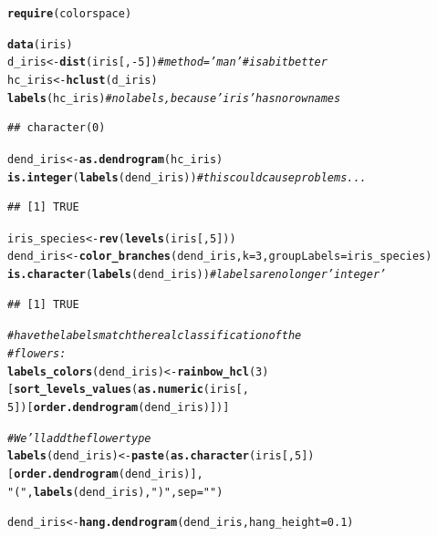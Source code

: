 \documentclass[shortnames,nojss,article]{jss}\usepackage[]{graphicx}\usepackage[]{color}
\makeatletter
\newcommand{\hlnum}[1]{\textcolor[rgb]{0.686,0.059,0.569}{#1}}%
\newcommand{\hlstr}[1]{\textcolor[rgb]{0.192,0.494,0.8}{#1}}%
\newcommand{\hlcom}[1]{\textcolor[rgb]{0.678,0.584,0.686}{\textit{#1}}}%
\newcommand{\hlopt}[1]{\textcolor[rgb]{0,0,0}{#1}}%
\newcommand{\hlstd}[1]{\textcolor[rgb]{0.345,0.345,0.345}{#1}}%
\newcommand{\hlkwb}[1]{\textcolor[rgb]{0.69,0.353,0.396}{#1}}%
\newcommand{\hlkwc}[1]{\textcolor[rgb]{0.333,0.667,0.333}{#1}}%
\newcommand{\hlkwd}[1]{\textcolor[rgb]{0.737,0.353,0.396}{\textbf{#1}}}%
\newenvironment{kframe}{%
 \def\at@end@of@kframe{}%
 \ifinner\ifhmode%
  \def\at@end@of@kframe{\end{minipage}}%
  \begin{minipage}{\columnwidth}%
 \fi\fi%
 \def\FrameCommand##1{\hskip\@totalleftmargin \hskip-\fboxsep
 \colorbox{shadecolor}{##1}\hskip-\fboxsep
     \hskip-\linewidth \hskip-\@totalleftmargin \hskip\columnwidth}%
 \MakeFramed {\advance\hsize-\width
   \@totalleftmargin\z@ \linewidth\hsize
   \@setminipage}}%
 {\par\unskip\endMakeFramed%
 \at@end@of@kframe}
\newenvironment{knitrout}{}{} %
\makeatother
\begin{document}
\begin{knitrout}
\color{fgcolor}\begin{kframe}
\begin{alltt}
\hlkwd{require}\hlstd{(colorspace}\hlstd{)}

\hlkwd{data}\hlstd{(iris)}
\hlstd{d_iris} \hlkwb{<-} \hlkwd{dist}\hlstd{(iris[,} \hlopt{-}\hlnum{5}\hlstd{])}  \hlcom{# method='man' # is a bit better}
\hlstd{hc_iris} \hlkwb{<-} \hlkwd{hclust}\hlstd{(d_iris)}
\hlkwd{labels}\hlstd{(hc_iris)}  \hlcom{# no labels, because 'iris' has no row names}
\end{alltt}
\begin{verbatim}
## character(0)
\end{verbatim}
\begin{alltt}
\hlstd{dend_iris} \hlkwb{<-} \hlkwd{as.dendrogram}\hlstd{(hc_iris)}
\hlkwd{is.integer}\hlstd{(}\hlkwd{labels}\hlstd{(dend_iris))}  \hlcom{# this could cause problems...}
\end{alltt}
\begin{verbatim}
## [1] TRUE
\end{verbatim}
\begin{alltt}
\hlstd{iris_species} \hlkwb{<-} \hlkwd{rev}\hlstd{(}\hlkwd{levels}\hlstd{(iris[,} \hlnum{5}\hlstd{]))}
\hlstd{dend_iris} \hlkwb{<-} \hlkwd{color_branches}\hlstd{(dend_iris,} \hlkwc{k} \hlstd{=} \hlnum{3}\hlstd{,} \hlkwc{groupLabels} \hlstd{= iris_species)}
\hlkwd{is.character}\hlstd{(}\hlkwd{labels}\hlstd{(dend_iris))}  \hlcom{# labels are no longer 'integer'}
\end{alltt}
\begin{verbatim}
## [1] TRUE
\end{verbatim}
\begin{alltt}
\hlcom{# have the labels match the real classification of the}
\hlcom{# flowers:}
\hlkwd{labels_colors}\hlstd{(dend_iris)} \hlkwb{<-} \hlkwd{rainbow_hcl}\hlstd{(}\hlnum{3}\hlstd{)[}\hlkwd{sort_levels_values}\hlstd{(}\hlkwd{as.numeric}\hlstd{(iris[,}
    \hlnum{5}\hlstd{])[}\hlkwd{order.dendrogram}\hlstd{(dend_iris)])}\hlstd{]}

\hlcom{# We'll add the flower type}
\hlkwd{labels}\hlstd{(dend_iris)} \hlkwb{<-} \hlkwd{paste}\hlstd{(}\hlkwd{as.character}\hlstd{(iris[,} \hlnum{5}\hlstd{])[}\hlkwd{order.dendrogram}\hlstd{(dend_iris)],}
    \hlstr{"("}\hlstd{,} \hlkwd{labels}\hlstd{(dend_iris),} \hlstr{")"}\hlstd{,} \hlkwc{sep} \hlstd{=} \hlstr{""}\hlstd{)}

\hlstd{dend_iris} \hlkwb{<-} \hlkwd{hang.dendrogram}\hlstd{(dend_iris,} \hlkwc{hang_height} \hlstd{=} \hlnum{0.1}\hlstd{)}


\end{alltt}
\end{kframe}
\end{knitrout}
\end{document}
